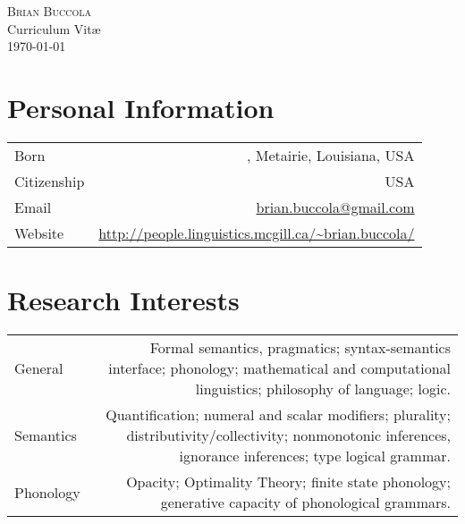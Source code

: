 \documentclass[10pt,letterpaper]{article}
\makeatletter
\newcommand{\name}{Brian Buccola}
\newcommand{\bodywidth}{0.81}
\newcommand{\myvrule}{\color{lightgray}\vrule width 1.0pt}
\newenvironment{cvsection}{%
  \renewcommand{\arraystretch}{1.60}
  \begin{longtable}[l]{@{} L R @{}}
}{%
  \end{longtable}
}
\makeatother
\begin{document}



\begin{center}
  {\Huge\scshape \name} \\[\baselineskip]

  Curriculum Vit\ae \\
  \today
\end{center}

\section*{Personal Information}

\begin{cvsection}
  Born & , Metairie, Louisiana, USA \\

  Citizenship & USA \\


  Email & \href{mailto:brian.buccola@gmail.com} {\ttfamily
    brian.buccola@gmail.com} \\

  Website & \url{http://people.linguistics.mcgill.ca/~brian.buccola/}
\end{cvsection}

\section*{Research Interests}

\begin{cvsection}
  General & Formal semantics, pragmatics; syntax-semantics interface;
  phonology; mathematical and computational linguistics; philosophy of
  language; logic. \\

  Semantics & Quantification; numeral and scalar modifiers; plurality;
  distributivity\slash collectivity; nonmonotonic inferences, ignorance
  inferences; type logical grammar. \\

  Phonology & Opacity; Optimality Theory; finite state phonology; generative
  capacity of phonological grammars. \\
\end{cvsection}
\end{document}
